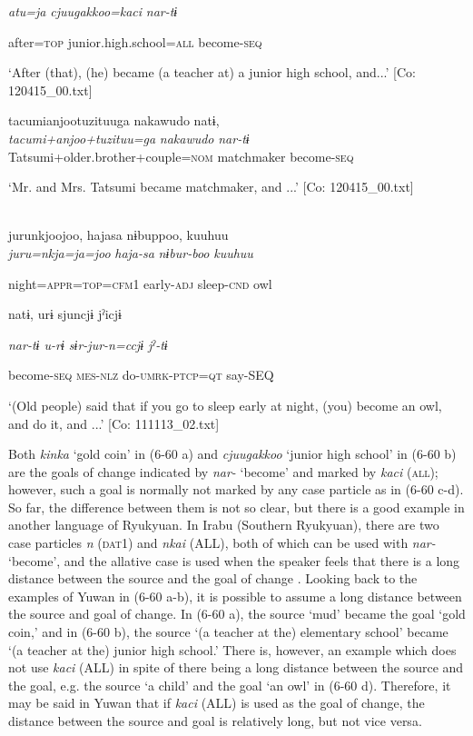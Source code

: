       \textit{atu=ja}  \textit{cjuugakkoo=kaci}  \textit{nar{}-tɨ}

      after=\textsc{top}  junior.high.school=\textsc{all}  become-\textsc{seq}

\glt ‘After (that), (he) became (a teacher at) a junior high school, and...’ [Co: 120415\_00.txt]
\z

 \ex {\TM}  tacumianjootuzituuga  nakawudo  natɨ,\\
\gll \textit{tacumi+anjoo+tuzituu=ga}  \textit{nakawudo}  \textit{nar{}-tɨ}\\

      Tatsumi+older.brother+couple=\textsc{nom}  matchmaker  become-\textsc{seq}

\glt ‘Mr. and Mrs. Tatsumi became matchmaker, and ...’ [Co: 120415\_00.txt]
\z

 \ex{}\\
{\TM}
\gll  jurunkjoojoo,  hajasa  nɨbuppoo,  kuuhuu\\

      \textit{juru=nkja=ja=joo}  \textit{haja-sa}  \textit{nɨbur-boo}  \textit{kuuhuu}

      night=\textsc{appr}=\textsc{top}=\textsc{cfm}1  early-\textsc{adj}  sleep-\textsc{cnd}  owl

      natɨ,  urɨ  sjuncjɨ  jˀicjɨ

      \textit{nar{}-tɨ  u-rɨ  sɨr-jur-n=ccjɨ  jˀ-tɨ}

      become-\textsc{seq}  \textsc{mes}-\textsc{nlz}  do-\textsc{umrk}-\textsc{ptcp}=\textsc{qt}  say-SEQ

\glt ‘(Old people) said that if you go to sleep early at night, (you) become an owl, and do it, and ...’ [Co: 111113\_02.txt]
\z

Both \textit{kinka} ‘gold coin’ in (6-60 a) and \textit{cjuugakkoo} ‘junior high school’ in (6-60 b) are the goals of change indicated by \textit{nar-} ‘become’ and marked by \textit{kaci} (\textsc{all}); however, such a goal is normally not marked by any case particle as in (6-60 c-d). So far, the difference between them is not so clear, but there is a good example in another language of Ryukyuan. In Irabu (Southern Ryukyuan), there are two case particles \textit{n} (\textsc{dat}1) and \textit{nkai} (ALL), both of which can be used with \textit{nar-} ‘become’, and the allative case is used when the speaker feels that there is a long distance between the source and the goal of change \citep{Shimoji2013}. Looking back to the examples of Yuwan in (6-60 a-b), it is possible to assume a long distance between the source and goal of change. In (6-60 a), the source ‘mud’ became the goal ‘gold coin,’ and in (6-60 b), the source ‘(a teacher at the) elementary school’ became ‘(a teacher at the) junior high school.’ There is, however, an example which does not use \textit{kaci} (ALL) in spite of there being a long distance between the source and the goal, e.g. the source ‘a child’ and the goal ‘an owl’ in (6-60 d). Therefore, it may be said in Yuwan that if \textit{kaci} (ALL) is used as the goal of change, the distance between the source and goal is relatively long, but not vice versa.

